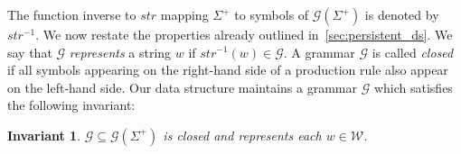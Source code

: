 \documentclass[a4paper]{article}
\newtheorem{invariant}[theorem]{Invariant}
\theoremstyle{remark}
\newcommand{\grammar}{\mathcal{G}}
\newcommand{\sstr}{\textit{str}}
\newcommand{\coll}{\mathcal{W}}
\begin{document}
The function inverse to $\sstr$ mapping $\Sigma^+$ to symbols of $\grammar(\Sigma^+)$ is denoted by $\sstr^{-1}$.
We now restate the properties already outlined in~\cref{sec:persistent_ds}.
We say that $\grammar$ \emph{represents} a string $w$ if $\sstr^{-1}(w) \in \grammar$.
A grammar $\grammar$ is called \emph{closed} if all symbols appearing on the right-hand side of a production rule
also appear on the left-hand side.
Our data structure maintains a grammar $\grammar$ which satisfies the following invariant:
\begin{invariant}
$\grammar \subseteq \grammar(\Sigma^+)$ is closed and represents each $w\in \coll$.
\end{invariant}




\end{document}

